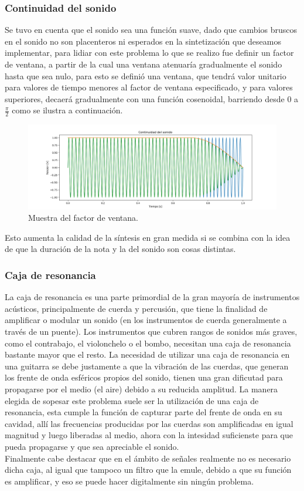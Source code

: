 \subsubsection{Continuidad del sonido}
Se tuvo en cuenta que el sonido sea una función suave, dado que cambios bruscos en el sonido no son placenteros ni esperados en la sintetización que deseamos implementar, para lidiar con este problema lo que se realizo fue definir un factor de ventana, a partir de la cual una ventana atenuaría gradualmente el sonido hasta que sea nulo, para esto se definió una ventana, que tendrá valor unitario para valores de tiempo menores al factor de ventana especificado, y para valores superiores, decaerá gradualmente con una función cosenoidal, barriendo desde 0 a $\frac{\pi}{2}$ como se ilustra a continuación.
\begin{figure}[H]
	\centering
	\includegraphics[width=1\textwidth]{ImagenesEjercicio4/continuidad.PNG}
\caption{Muestra del factor de ventana.}
	\label{fig:windowfactor}
\end{figure}
Esto aumenta la calidad de la síntesis en gran medida si se combina con la idea de que la duración de la nota y la del sonido son cosas distintas.
\subsubsection{Caja de resonancia}
La caja de resonancia es una parte primordial de la gran mayoría de instrumentos acústicos, principalmente de cuerda y percusión, que tiene la finalidad de amplificar o modular un sonido (en los instrumentos de cuerda generalmente a través de un puente). 
Los instrumentos que cubren rangos de sonidos más graves, como el contrabajo, el violonchelo o el bombo, necesitan una caja de resonancia bastante mayor que el resto.
La necesidad de utilizar una caja de resonancia en una guitarra se debe justamente a que la vibración de las cuerdas, que generan los frente de onda esféricos propios del sonido, tienen una gran dificutad para propagarse por el medio (el aire) debido a su reducida amplitud. La manera elegida de sopesar este problema suele ser la utilización de una caja de resonancia, esta cumple la función de capturar parte del frente de onda en su cavidad, allí las frecuencias producidas por las cuerdas son amplificadas en igual magnitud y luego liberadas al medio, ahora con la intesidad suficienste para que pueda propagarse y que sea apreciable el sonido.\\
Finalmente cabe destacar que en el ámbito de señales realmente no es necesario dicha caja, al igual que tampoco un filtro que la emule, debido a que su función es amplificar, y eso se puede hacer digitalmente sin ningún problema. 


